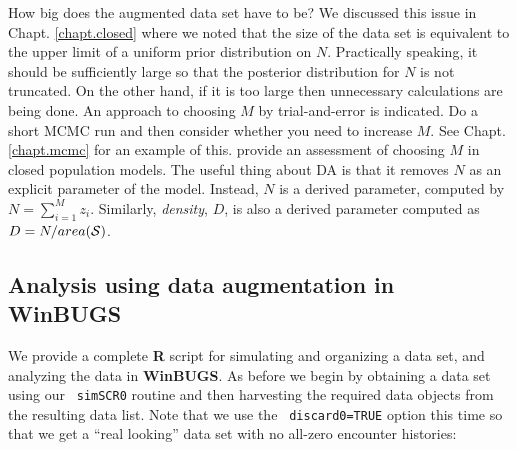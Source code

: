 How big does the augmented data set have to be? We discussed this
issue in Chapt. \ref{chapt.closed} where we noted that the size of the
data set is equivalent to the upper limit of a uniform prior
distribution on $N$.  Practically speaking, it should be sufficiently
large so that the posterior distribution for $N$ is not truncated. On
the other hand, if it is too large then unnecessary calculations are
being done. An approach to choosing $M$ by trial-and-error is
indicated.
Do a short MCMC run and then consider
whether you need to increase $M$. See Chapt. \ref{chapt.mcmc} for an
example of this. \citet[][ch. 6]{kery_schaub:2011} provide an
assessment of choosing $M$ in closed population models.
The useful thing about DA
is that it removes $N$ as an explicit parameter of
the model. Instead, $N$ is a derived parameter, computed by $N=
\sum_{i=1}^{M} z_{i}$. Similarly, {\it density}, $D$, is also a
derived parameter computed as $D=N/area({\cal S})$.


\subsection{Analysis using data augmentation in WinBUGS}

We provide a complete {\bf R} script for simulating and organizing a
data set, and analyzing the data in {\bf WinBUGS}.
As before we begin by obtaining a data set using our \mbox{\tt
  simSCR0} routine and then harvesting the required data objects
from the resulting data list.  Note that we use the \mbox{\tt
  discard0=TRUE} option this time so that we get a ``real looking'' data set
with no all-zero encounter histories:

